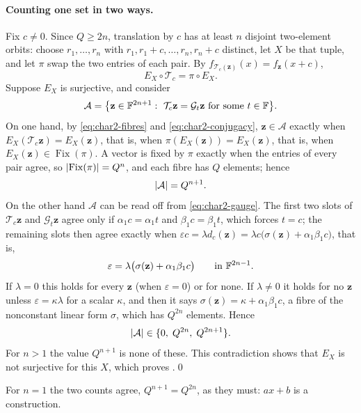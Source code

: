 \paragraph{Counting one set in two ways.}
Fix $c\neq0$.  Since $Q\ge2n$, translation by $c$ has at least $n$ disjoint two-element
orbits: choose $r_1,\dots,r_n$ with $r_1,r_1+c,\dots,r_n,r_n+c$ distinct, let $X$ be that
tuple, and let $\pi$ swap the two entries of each pair.  By
$f_{\mathcal T_c(\mathbf z)}(x)=f_{\mathbf z}(x+c)$,
\begin{equation}
   E_X\circ\mathcal T_c=\pi\circ E_X .
   \label{eq:char2-conjugacy}
\end{equation}
Suppose $E_X$ is surjective, and consider
\[
   \mathcal A=\bigl\{\mathbf z\in\mathbb{F}^{2n+1}:\
   \mathcal T_c\mathbf z=\mathcal G_t\mathbf z\text{ for some }t\in\mathbb{F}\bigr\}.
\]
On one hand, by \eqref{eq:char2-fibres} and \eqref{eq:char2-conjugacy},
$\mathbf z\in\mathcal A$ exactly when $E_X(\mathcal T_c\mathbf z)=E_X(\mathbf z)$, that is,
when $\pi(E_X(\mathbf z))=E_X(\mathbf z)$, that is, when
$E_X(\mathbf z)\in\operatorname{Fix}(\pi)$.  A vector is fixed by $\pi$ exactly when the
entries of every pair agree, so $\left\lvert \operatorname{Fix}(\pi)\right\rvert=Q^n$, and each fibre has
$Q$ elements; hence
\[
   \left\lvert \mathcal A\right\rvert=Q^{n+1}.
\]
On the other hand $\mathcal A$ can be read off from \eqref{eq:char2-gauge}.  The first two
slots of $\mathcal T_c\mathbf z$ and $\mathcal G_t\mathbf z$ agree only if
$\alpha_1c=\alpha_1t$ and $\beta_1c=\beta_1t$, which forces $t=c$; the remaining slots
then agree exactly when
$\varepsilon c=\lambda d_c(\mathbf z)=\lambda c\bigl(\sigma(\mathbf z)+\alpha_1\beta_1c\bigr)$,
that is,
\[
   \varepsilon=\lambda\bigl(\sigma(\mathbf z)+\alpha_1\beta_1c\bigr)
   \qquad\text{in }\mathbb{F}^{2n-1}.
\]
If $\lambda=0$ this holds for every $\mathbf z$ (when $\varepsilon=0$) or for none.  If
$\lambda\neq0$ it holds for no $\mathbf z$ unless $\varepsilon=\kappa\lambda$ for a scalar
$\kappa$, and then it says $\sigma(\mathbf z)=\kappa+\alpha_1\beta_1c$, a fibre of the
nonconstant linear form $\sigma$, which has $Q^{2n}$ elements.  Hence
\begin{equation}
   \left\lvert \mathcal A\right\rvert\in\{0,\;Q^{2n},\;Q^{2n+1}\}.
   \label{eq:char2-fix}
\end{equation}
For $n>1$ the value $Q^{n+1}$ is none of these.  This contradiction shows that $E_X$ is
not surjective for this $X$, which proves \Cref{thm:char2-lower}.\qed

For $n=1$ the two counts agree, $Q^{n+1}=Q^{2n}$, as they must: $ax+b$ is a construction.

